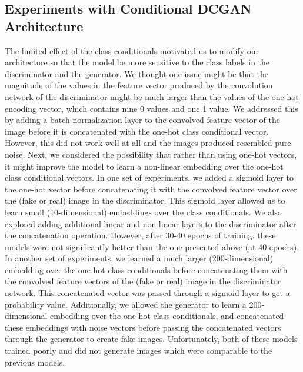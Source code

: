 \documentclass[a4paper]{article}
\begin{document}
\subsection*{Experiments with Conditional DCGAN Architecture}
The limited effect of the class conditionals motivated us to modify our architecture so that the model be more sensitive to the class labels in the discriminator and the generator. We thought one issue might be that the magnitude of the values in the feature vector produced by the convolution network of the discriminator might be much larger than the values of the one-hot encoding vector, which contains nine 0 values and one 1 value. We addressed this by adding a batch-normalization layer to the convolved feature vector of the image before it is concatenated with the one-hot class conditional vector. However, this did not work well at all and the images produced resembled pure noise.
\newline
\newline
Next, we considered the possibility that rather than using one-hot vectors, it might improve the model to learn a non-linear embedding over the one-hot class conditional vectors. In one set of experiments, we added a sigmoid layer to the one-hot vector before concatenating it with the convolved feature vector over the (fake or real) image in the discriminator. This sigmoid layer allowed us to learn small (10-dimensional) embeddings over the class conditionals. We also explored adding additional linear and non-linear layers to the discriminator after the concatenation operation. However, after 30-40 epochs of training, these models were not significantly better than the one presented above (at 40 epochs).
\newline
\newline
In another set of experiments, we learned a much larger (200-dimensional) embedding over the one-hot class conditionals before concatenating them with the convolved feature vectors of the (fake or real) image in the discriminator network. This concatenated vector was passed through a sigmoid layer to get a probability value. Additionally, we allowed the generator to learn a 200-dimensional embedding over the one-hot class conditionals, and concatenated these embeddings with noise vectors before passing the concatenated vectors through the generator to create fake images. Unfortunately, both of these models trained poorly and did not generate images which were comparable to the previous models. 
\end{document}
